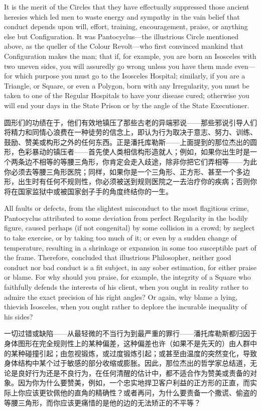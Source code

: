 \documentclass[12pt,UTF8]{ctexbook}
\begin{document}
It is the merit of the Circles that they have effectually suppressed those ancient heresies which led men to waste energy and sympathy in the vain belief that conduct depends upon will, effort, training, encouragement, praise, or anything else but Configuration. It was Pantocyclus---the illustrious Circle mentioned above, as the queller of the Colour Revolt---who first convinced mankind that Configuration makes the man; that if, for example, you are born an Isosceles with two uneven sides, you will assuredly go wrong unless you have them made even---for which purpose you must go to the Isosceles Hospital; similarly, if you are a Triangle, or Square, or even a Polygon, born with any Irregularity, you must be taken to one of the Regular Hospitals to have your disease cured; otherwise you will end your days in the State Prison or by the angle of the State Executioner.

圆形们的功绩在于，他们有效地镇压了那些古老的异端邪说——那些邪说引导人们将精力和同情心浪费在一种徒劳的信念上，即认为行为取决于意志、努力、训练、鼓励、赞美或构形之外的任何东西。正是潘托库勒斯——上面提到的那位杰出的圆形，色彩暴动的镇压者——首先使人类相信构形造就人；例如，如果你出生时是一个两条边不相等的等腰三角形，你肯定会走入歧途，除非你把它们弄相等——为此你必须去等腰三角形医院；同样，如果你是一个三角形、正方形、甚至一个多边形，出生时有任何不规则性，你必须被送到规则医院之一去治疗你的疾病；否则你将在国家监狱中或被国家刽子手的角度终结你的一生。

All faults or defects, from the slightest misconduct to the most flagitious crime, Pantocyclus attributed to some deviation from perfect Regularity in the bodily figure, caused perhaps (if not congenital) by some collision in a crowd; by neglect to take exercise, or by taking too much of it; or even by a sudden change of temperature, resulting in a shrinkage or expansion in some too susceptible part of the frame. Therefore, concluded that illustrious Philosopher, neither good conduct nor bad conduct is a fit subject, in any sober estimation, for either praise or blame. For why should you praise, for example, the integrity of a Square who faithfully defends the interests of his client, when you ought in reality rather to admire the exact precision of his right angles? Or again, why blame a lying, thievish Isosceles, when you ought rather to deplore the incurable inequality of his sides?

一切过错或缺陷——从最轻微的不当行为到最严重的罪行——潘托库勒斯都归因于身体图形在完全规则性上的某种偏差，这种偏差也许（如果不是先天的）由人群中的某种碰撞引起；由忽视锻炼，或过度锻炼引起；或甚至由温度的突然变化，导致身体结构中某个过于敏感的部分收缩或膨胀。因此，那位杰出的哲学家总结道，无论是良好行为还是不良行为，在任何清醒的估计中，都不适合作为赞美或责备的对象。因为你为什么要赞美，例如，一个忠实地捍卫客户利益的正方形的正直，而实际上你应该更钦佩他的直角的精确性？或者再问，为什么要责备一个撒谎、偷盗的等腰三角形，而你应该更痛惜的是他的边的无法矫正的不平等？
\end{document}
